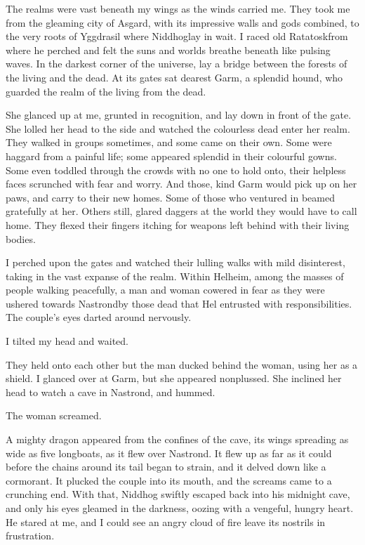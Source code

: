 
The realms were vast beneath my wings as the winds carried me. They took me from the gleaming city of Asgard, with its impressive walls and gods combined, to the very roots of Yggdrasil where Niddhog\footnotemark[1] lay in wait. I raced old Ratatosk\footnotemark[2] from where he perched and felt the suns and worlds breathe beneath like pulsing waves. In the darkest corner of the universe, lay a bridge between the forests of the living and the dead. At its gates sat dearest Garm, a splendid hound, who guarded the realm of the living from the dead. 

She glanced up at me, grunted in recognition, and lay down in front of the gate. She lolled her head to the side and watched the colourless dead enter her realm. They walked in groups sometimes, and some came on their own. Some were haggard from a painful life; some appeared splendid in their colourful gowns. Some even toddled through the crowds with no one to hold onto, their helpless faces scrunched with fear and worry. And those, kind Garm would pick up on her paws, and carry to their new homes. Some of those who ventured in beamed gratefully at her. Others still, glared daggers at the world they would have to call home. They flexed their fingers itching for weapons left behind with their living bodies.
 
I perched upon the gates and watched their lulling walks with mild disinterest, taking in the vast expanse of the realm. Within Helheim, among the masses of people walking peacefully, a man and woman cowered in fear as they were ushered towards Nastrond\footnotemark[3] by those dead that Hel entrusted with responsibilities. The couple's eyes darted around nervously. 

I tilted my head and waited.

They held onto each other but the man ducked behind the woman, using her as a shield. I glanced over at Garm, but she appeared nonplussed. She inclined her head to watch a cave in Nastrond, and hummed. 

The woman screamed.

A mighty dragon appeared from the confines of the cave, its wings spreading as wide as five longboats, as it flew over Nastrond. It flew up as far as it could before the chains around its tail began to strain, and it delved down like a cormorant. It plucked the couple into its mouth, and the screams came to a crunching end. With that, Niddhog swiftly escaped back into his midnight cave, and only his eyes gleamed in the darkness, oozing with a vengeful, hungry heart. He stared at me, and I could see an angry cloud of fire leave its nostrils in frustration.

